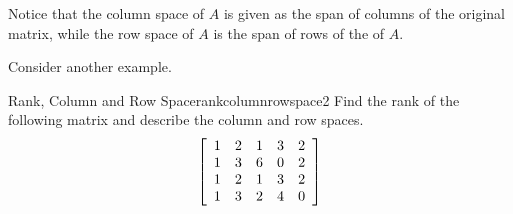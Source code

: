 Notice that the column space of $A$ is given as the span of columns of the original matrix, while the row space of $A$ is the span of rows of the {\rref} of $A$. 

Consider another example.

\begin{example}{Rank, Column and Row Space}{rankcolumnrowspace2}
Find the rank of the following matrix and describe the
column and row spaces.
\begin{equation*}
\left[
\begin{array}{rrrrrr}
1 & 2 & 1 & 3 & 2 \\
1 & 3 & 6 & 0 & 2 \\
1 & 2 & 1 & 3 & 2 \\
1 & 3 & 2 & 4 & 0
\end{array}
\right]
\end{equation*}
\end{example}

